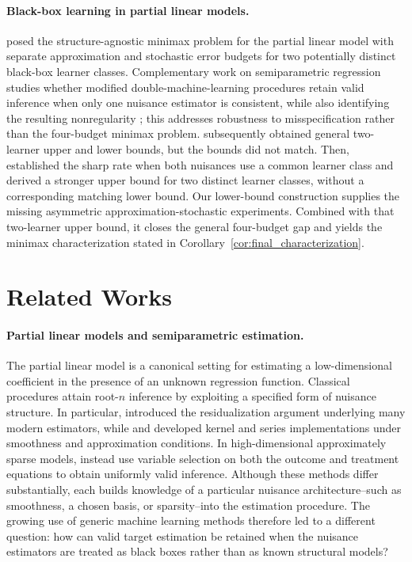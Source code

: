\documentclass[11pt]{article}
\begin{document}
\paragraph{Black-box learning in partial linear models.}
\citet{gu2025open} posed the structure-agnostic minimax problem for the partial
linear model with separate approximation and stochastic error budgets for two
potentially distinct black-box learner classes. Complementary work on
semiparametric regression studies whether modified double-machine-learning
procedures retain valid inference when only one nuisance estimator is
consistent, while also identifying the resulting nonregularity
\citep{dukes2024doublyrobust}; this addresses robustness to misspecification
rather than the four-budget minimax problem. \citet{gu2026taming} subsequently
obtained general two-learner upper and lower bounds, but the bounds did not match.
Then, \citet{gu2026optimal} established the sharp rate when both nuisances use a
common learner class and derived a stronger upper bound for two distinct learner classes, without a corresponding matching lower bound. Our
lower-bound construction supplies the missing asymmetric
approximation-stochastic experiments. Combined with that two-learner upper
bound, it closes the general four-budget gap and yields the minimax
characterization stated in Corollary~\ref{cor:final_characterization}.


\iffalse
\section{Related Works}
\label{sec:related-work}
\paragraph{Partial linear models and semiparametric estimation.}
The partial linear model is a canonical setting for estimating a
low-dimensional coefficient in the presence of an unknown regression
function.  Classical procedures attain root-$n$ inference by exploiting a
specified form of nuisance structure.  In particular,
\citet{robinson1988root} introduced the residualization argument underlying
many modern estimators, while \citet{speckman1988kernel} and
\citet{donald1994series} developed kernel and series implementations under
smoothness and approximation conditions.  In high-dimensional approximately
sparse models, \citet{belloni2014inference} instead use variable selection on
both the outcome and treatment equations to obtain uniformly valid inference.
Although these methods differ substantially, each builds knowledge of a
particular nuisance architecture--such as smoothness, a chosen basis, or
sparsity--into the estimation procedure.  The growing use of generic machine
learning methods therefore led to a different question: how can valid target
estimation be retained when the nuisance estimators are treated as black
boxes rather than as known structural models?
\end{document}
